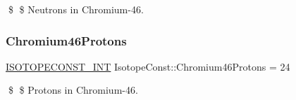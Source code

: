 \$ \$ Neutrons in Chromium-\/46. \mbox{\label{group___isotope_const-_chromium-_cr46_ga9a2edfb6469e250f48327fd1727b5823}} 
\subsubsection{\texorpdfstring{Chromium46\+Protons}{Chromium46Protons}}
{\footnotesize\ttfamily \mbox{\hyperlink{group___isotope_const-_macros_ga5f18360b3e99483a35c32d789e62621c}{I\+S\+O\+T\+O\+P\+E\+C\+O\+N\+S\+T\+\_\+\+I\+NT}} Isotope\+Const\+::\+Chromium46\+Protons = 24}

\$ \$ Protons in Chromium-\/46. 